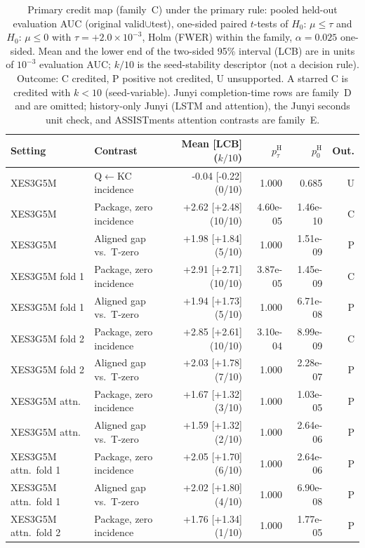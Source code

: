 \begin{table}[tbp]
\caption{Primary credit map (family~C) under the primary rule:
pooled held-out evaluation AUC (original valid$\cup$test), one-sided
paired $t$-tests of $H_0{:}\,\mu\le\tau$ and $H_0{:}\,\mu\le 0$ with
$\tau{=}{+}2.0\times 10^{-3}$, Holm (FWER) within the family,
$\alpha{=}0.025$ one-sided. Mean and the lower end of the two-sided
95\% interval (LCB) are in units of $10^{-3}$ evaluation AUC; $k/10$
is the seed-stability descriptor (not a decision rule). Outcome: C
credited, P positive not credited, U unsupported. A starred C is
credited with $k{<}10$ (seed-variable). Junyi completion-time rows
are family~D and are omitted; history-only Junyi (LSTM and
attention), the Junyi seconds unit check, and ASSISTments
attention contrasts are family~E.}\label{tab:credit-primary-c}
\centering
\scriptsize
\setlength{\tabcolsep}{2.5pt}
\begin{tabular}{@{}llrrrr@{}}
\toprule
Setting & Contrast & Mean [LCB] ($k/10$) & $p_{\tau}^{\mathrm{H}}$ & $p_{0}^{\mathrm{H}}$ & Out. \\
\midrule
XES3G5M & Q$\leftarrow$KC incidence & -0.04 [-0.22] (0/10) & 1.000 & 0.685 & U \\
XES3G5M & Package, zero incidence & +2.62 [+2.48] (10/10) & 4.60e-05 & 1.46e-10 & C \\
XES3G5M & Aligned gap vs.\ T-zero & +1.98 [+1.84] (5/10) & 1.000 & 1.51e-09 & P \\
XES3G5M fold 1 & Package, zero incidence & +2.91 [+2.71] (10/10) & 3.87e-05 & 1.45e-09 & C \\
XES3G5M fold 1 & Aligned gap vs.\ T-zero & +1.94 [+1.73] (5/10) & 1.000 & 6.71e-08 & P \\
XES3G5M fold 2 & Package, zero incidence & +2.85 [+2.61] (10/10) & 3.10e-04 & 8.99e-09 & C \\
XES3G5M fold 2 & Aligned gap vs.\ T-zero & +2.03 [+1.78] (7/10) & 1.000 & 2.28e-07 & P \\
XES3G5M attn. & Package, zero incidence & +1.67 [+1.32] (3/10) & 1.000 & 1.03e-05 & P \\
XES3G5M attn. & Aligned gap vs.\ T-zero & +1.59 [+1.32] (2/10) & 1.000 & 2.64e-06 & P \\
XES3G5M attn.\ fold 1 & Package, zero incidence & +2.05 [+1.70] (6/10) & 1.000 & 2.64e-06 & P \\
XES3G5M attn.\ fold 1 & Aligned gap vs.\ T-zero & +2.02 [+1.80] (4/10) & 1.000 & 6.90e-08 & P \\
XES3G5M attn.\ fold 2 & Package, zero incidence & +1.76 [+1.34] (1/10) & 1.000 & 1.77e-05 & P \\

\end{tabular}
\end{table}

